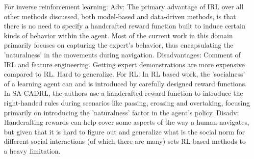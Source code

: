 For inverse reinforcement learning:
Adv:
The primary advantage of IRL over all other methods discussed, both model-based and data-driven methods, is that there is no need to specify a handcrafted reward function built to induce certain kinds of behavior within the agent. Most of the current work in this domain primarily focuses on capturing the expert's behavior, thus encapsulating the 'naturalness' in the movements during navigation.
Disadvantages:
Comment of IRL and feature engineering. 
Getting expert demonstrations are more expensive compared to RL.
Hard to generalize. 
For RL:
In RL based work, the 'socialness' of a learning agent can and is introduced by carefully designed reward functions. In SA-CADRL, the authors use a handcrafted reward function to introduce the right-handed rules during scenarios like passing, crossing and overtaking, focusing primarily on introducing the 'naturalness' factor in the agent's policy.
Disadv:
Handcrafting rewards can help cover some aspects of the way a human navigates, but given that it is hard to figure out and generalize what is the social norm for different social interactions (of which there are many) sets RL based methods to a heavy limitation.
